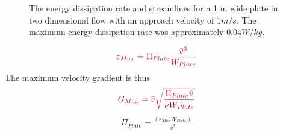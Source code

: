 \documentclass[letterpaper,10pt,english]{sphinxmanual}
\let\sphinxpxdimen\pdfpxdimen\else\newdimen\sphinxpxdimen
\begin{document}
\begin{figure}[htbp]
\centering
\capstart

\noindent\sphinxincludegraphics[width=600\sphinxpxdimen]{{CFD_Flat_Plate}.png}
\caption{The energy dissipation rate and streamlines for a 1 m wide plate in two dimensional flow with an approach velocity of \(1 m/s\). The maximum energy dissipation rate was approximately \(0.04 W/kg\).}\label{\detokenize{Rapid_Mix/RM_Derivations:id8}}\label{\detokenize{Rapid_Mix/RM_Derivations:figure-cfd-flat-plate}}\end{figure}
\begin{equation}\label{equation:Rapid_Mix/RM_Derivations:Rapid_Mix/RM_Derivations:104}
\begin{split}\color{purple}{
  \varepsilon _{Max} = \Pi_{Plate}\frac{\bar v^3}{W_{Plate}}
  }\end{split}
\end{equation}
The maximum velocity gradient is thus
\begin{equation}\label{equation:Rapid_Mix/RM_Derivations:Rapid_Mix/RM_Derivations:105}
\begin{split}\color{purple}{
  G_{Max} = \bar v\sqrt{\frac{\Pi_{Plate} \bar v}{\nu W_{Plate}}}
  }\end{split}
\end{equation}\begin{equation}\label{equation:Rapid_Mix/RM_Derivations:Rapid_Mix/RM_Derivations:106}
\begin{split}\Pi_{Plate} = \frac{ \left( \varepsilon_{Max} W_{Plate} \right)}{\bar v^3}\end{split}
\end{equation}
%
\begin{sphinxVerbatim}[commandchars=\\\{\}]
  
  
  
    
\end{sphinxVerbatim}
\end{document}
